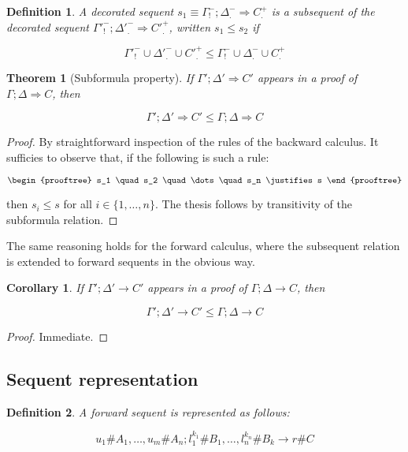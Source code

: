\documentclass{article}
\newtheorem{theorem}{Theorem}
\newtheorem{definition}{Definition}
\newtheorem{corollary}{Corollary}
\newcommand{\subsequent}[2]{#1 \leq #2}
\begin{document}
\begin{definition}
  A decorated sequent $s_1 \equiv \Gamma^-_! ; \Delta^-_. \Longrightarrow C^+_.$
  is a subsequent of the decorated sequent
  $\Gamma'^-_! ; \Delta'^-_. \Longrightarrow C'^+_.$, written $s_1 \leq s_2$ if

  \[
    \subsequent{\Gamma'^-_! \cup \Delta'^-_. \cup C'^+_.}
    {\Gamma^-_! \cup \Delta^-_. \cup C^+_.}
  \]
\end{definition}

\begin{theorem}[Subformula property]
  If $\Gamma'; \Delta' \Longrightarrow C'$ appears in a proof of
  $\Gamma; \Delta \Longrightarrow C$, then

  \[
    \subsequent{\Gamma'; \Delta' \Longrightarrow C'}
    {\Gamma; \Delta \Longrightarrow C}
  \]
\end{theorem}
\begin{proof}
  By straightforward inspection of the rules of the backward calculus. It
  sufficies to observe that, if the following is such a rule:

  \[
    \begin{prooftree}
      s_1 \quad s_2 \quad \dots \quad s_n
      \justifies
      s
    \end{prooftree}
  \]

  then $s_i \leq s$ for all $i \in \{1, \dots, n\}$. The thesis follows by
  transitivity of the subformula relation.
\end{proof}

The same reasoning holds for the forward calculus, where the subsequent relation
is extended to forward sequents in the obvious way.

\begin{corollary}
  If $\Gamma'; \Delta' \longrightarrow C'$ appears in a proof of
  $\Gamma; \Delta \longrightarrow C$, then

  \[
    \subsequent{
      \Gamma'; \Delta' \longrightarrow C'
    }{
      \Gamma; \Delta \longrightarrow C
    }
  \]
\end{corollary}
\begin{proof}
  Immediate.
\end{proof}

\subsection{Sequent representation}

\begin{definition}
  A forward sequent is represented as follows:

  \[
    u_1 \# A_1, \dots, u_m \# A_n ; l_1^{k_1} \# B_1, \dots, l_n^{k_n} \# B_k
    \longrightarrow r \# C
  \]
\end{definition}
\end{document}
